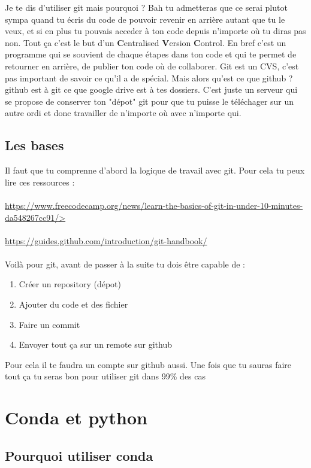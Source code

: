 \documentclass[10pt,a4paper]{book}
\begin{document}
Je te dis d'utiliser git mais pourquoi ? Bah tu admetteras que ce serai plutot sympa quand tu écris du code de pouvoir revenir en arrière autant que tu le veux, et si en plus tu pouvais acceder à ton code depuis n'importe où tu diras pas non. Tout ça c'est le but d'un \textbf{C}entralised \textbf{V}ersion \textbf{C}ontrol. En bref c'est un programme qui se souvient de chaque étapes dans ton code et qui te permet de retourner en arrière, de publier ton code où de collaborer.
Git est un CVS, c'est pas important de savoir ce qu'il a de spécial.
Mais alors qu'est ce que github ? github est à git ce que google drive est à tes dossiers. C'est juste un serveur qui se propose de conserver ton "dépot" git pour que tu puisse le téléchager sur un autre ordi et donc travailler de n'importe où avec n'importe qui. 

\subsection{Les bases}
Il faut que tu comprenne d'abord la logique de travail avec git. Pour cela tu peux lire ces ressources :
\\\\
\url{https://www.freecodecamp.org/news/learn-the-basics-of-git-in-under-10-minutes-da548267cc91/>}
\\\\
\url{https://guides.github.com/introduction/git-handbook/}
\\\\
Voilà pour git, avant de passer à la suite tu dois être capable de :
\begin{enumerate}
\item Créer un repository (dépot)
\item Ajouter du code et des fichier
\item Faire un commit
\item Envoyer tout ça sur un remote sur github
\end{enumerate}

Pour cela il te faudra un compte sur github aussi.
Une fois que tu sauras faire tout ça tu seras bon pour utiliser git dans 99\% des cas
\section{Conda et python}
\subsection{Pourquoi utiliser conda}
\end{document}
